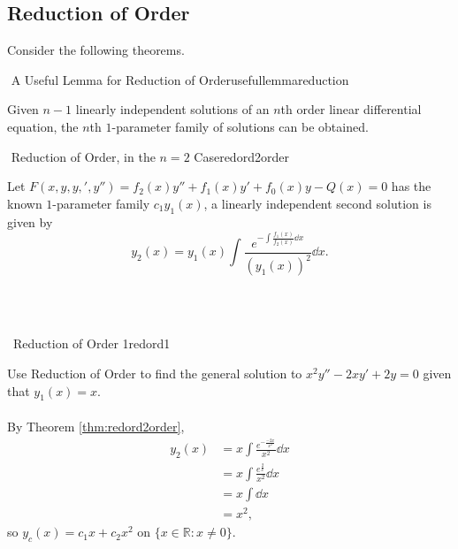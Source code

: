         \pagebreak

    \subsection{Reduction of Order}

        Consider the following theorems.
        \begin{theorem}{\Stop\,\,A Useful Lemma for Reduction of Order}{usefullemmareduction}

            Given \(n-1\) linearly independent solutions of an \(n\)th order linear differential equation, the \(n\)th \(1\)-parameter family of solutions can be obtained.
            
        \end{theorem}
        \begin{theorem}{\Stop\,\,Reduction of Order, in the \(n=2\) Case}{redord2order}

            Let \(F(x,y,y,',y'')=f_2(x)y''+f_1(x)y'+f_0(x)y-Q(x)=0\) has the known \(1\)-parameter family \(c_1y_1(x)\), a linearly independent second solution is given by
            \begin{equation*}
                y_2(x)=y_1(x)\int \frac{e^{-\int \frac{f_1(x)}{f_2(x)}\dd x}}{(y_1(x))^2} \dd x.
            \end{equation*}
            
        \end{theorem}
        \vphantom
        \\
        \\
        \begin{example}{\Difficulty\,\Difficulty\,\,Reduction of Order 1}{redord1}

            Use Reduction of Order to find the general solution to \(x^2y''-2xy'+2y=0\) given that \(y_1(x)=x\).
            \\
            \\
            By Theorem \ref{thm:redord2order},
            \begin{align*}
                y_2(x)&=x\int \frac{e^{-\frac{-2x}{x^2}}}{x^2}\dd x \\
                &=x\int \frac{e^{\frac{2}{x}}}{x^2} \dd x \\
                &=x\int \dd x \\
                &=x^2,
            \end{align*}
            so \(y_c(x)=c_1x+c_2x^2\) on \(\{x\in\mathbb{R}:x\neq0\}\).
            
        \end{example}
